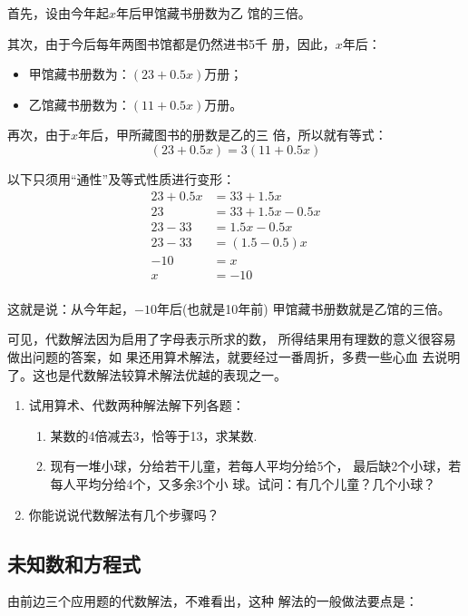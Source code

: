 \begin{solution}
首先，设由今年起$x$年后甲馆藏书册数为乙
馆的三倍。

    其次，由于今后每年两图书馆都是仍然进书5千
册，因此，$x$年后：
\begin{itemize}
    \item 甲馆藏书册数为：$(23 + 0. 5x)$万册；
    \item  乙馆藏书册数为：$(11+0.5x)$万册。
\end{itemize}

    再次，由于$x$年后，甲所藏图书的册数是乙的三
倍，所以就有等式：
\[(23 + 0. 5x)=3(11+0.5x) \]

以下只须用“通性”及等式性质进行变形：
\begin{align*}
    23 + 0. 5x& =33+1.5x \tag{分配律}\\
23&=33+1.5x-0.5x  \tag{两边同减$0.5x$}\\
23-33&=1.5x-0. 5x  \tag{两边同减33}\\
23-33&=(1.5-0.5) x  \tag{分配律}\\
-10&=x  \tag{减法法则}\\
x&=-10  \tag{两边调换位置}\\
\end{align*}
    
这就是说：从今年起，$-10$年后(也就是10年前)
甲馆藏书册数就是乙馆的三倍。
\end{solution}

    可见，代数解法因为启用了字母表示所求的数，
所得结果用有理数的意义很容易做出问题的答案，如
果还用算术解法，就要经过一番周折，多费一些心血
去说明了。这也是代数解法较算术解法优越的表现之一。

\begin{ex}
\begin{enumerate}
    \item 试用算术、代数两种解法解下列各题：
    \begin{enumerate}
        \item 某数的4倍减去3，恰等于13，求某数.
        \item 现有一堆小球，分给若干儿童，若每人平均分给5个，
    最后缺2个小球，若每人平均分给4个，又多余3个小
    球。试问：有几个儿童？几个小球？
    \end{enumerate}

    \item 你能说说代数解法有几个步骤吗？
\end{enumerate}
\end{ex}
    
\subsection{未知数和方程式}
  由前边三个应用题的代数解法，不难看出，这种
解法的一般做法要点是：

